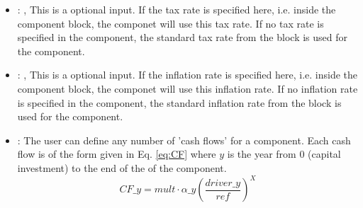 \begin{itemize}
    \item {}: , 
      This is a optional input. If the tax rate is specified here, i.e. inside the component block,
      the componet will use this tax rate.                                 If no tax rate is
      specified in the component, the standard tax rate from the  block is used for
      the component.

    \item {}: , 
      This is a optional input. If the inflation rate is specified here, i.e. inside the component
      block,                                 the componet will use this inflation rate. If no
      inflation rate is specified in the component, the standard inflation rate from the
                                       block is used for the component.

    \item {}:
      The user can define any number of 'cash flows' for a component. Each cash flow is of the form
      given in                                   Eq. \ref{eq:CF} where $y$ is the year from 0
      (capital investment) to the end of the  of the component.
      \begin{equation}\label{eq:CF}
      CF\_{y}=mult\cdot\alpha\_{y}\left ( \frac{driver\_{y}}{ref} \right )^{X}
      \end{equation}


\end{itemize}
